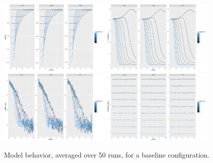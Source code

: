 \begin{figure}
\centering
\includegraphics[width=0.48\textwidth]{figures/baseline_indicdeltaU0}
\includegraphics[width=0.48\textwidth]{figures/baseline_indicindivMigrations}\\
\includegraphics[width=0.48\textwidth]{figures/baseline_indicjobDistance0}
\includegraphics[width=0.48\textwidth]{figures/baseline_indicutilitiesDecOrigin0_5}
\caption{Model behavior, averaged over 50 runs, for a baseline configuration.}
\label{fig:baseline-indics}
\end{figure}


